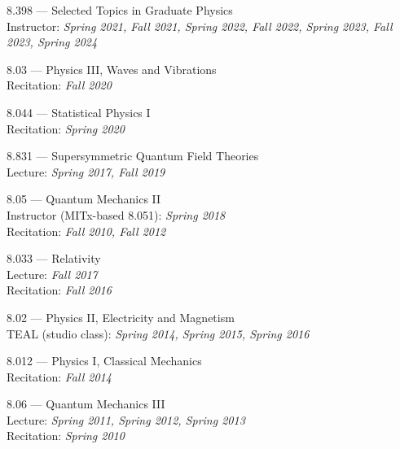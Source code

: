 \bbl
\item 8.398 --- Selected Topics in Graduate Physics
\\ Instructor: \emph{Spring 2021, Fall 2021, Spring 2022, Fall 2022, Spring 2023, Fall 2023, Spring 2024}
\item 8.03 --- Physics III, Waves and Vibrations
\\ Recitation: \emph{Fall 2020}
\item 8.044 --- Statistical Physics I
\\ Recitation: \emph{Spring 2020}
\item 8.831 --- Supersymmetric Quantum Field Theories
\\ Lecture: \emph{Spring 2017, Fall 2019}
\item 8.05 --- Quantum Mechanics II
\\ Instructor (MITx-based 8.051): \emph{Spring 2018}
\\ Recitation: \emph{Fall 2010, Fall 2012}
\item 8.033 --- Relativity
\\ Lecture: \emph{Fall 2017}
\\ Recitation: \emph{Fall 2016}
\item 8.02 --- Physics II, Electricity and Magnetism
\\ TEAL (studio class): \emph{Spring 2014, Spring 2015, Spring 2016}
\item 8.012 --- Physics I, Classical Mechanics
\\ Recitation: \emph{Fall 2014}
\item 8.06 --- Quantum Mechanics III
\\ Lecture: \emph{Spring 2011, Spring 2012, Spring 2013}
\\ Recitation: \emph{Spring 2010}
\el
